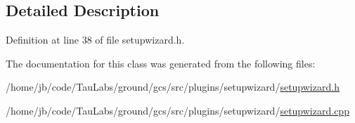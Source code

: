 \subsection{\-Detailed \-Description}


\-Definition at line 38 of file setupwizard.\-h.



\-The documentation for this class was generated from the following files\-:\begin{DoxyCompactItemize}
\item 
/home/jb/code/\-Tau\-Labs/ground/gcs/src/plugins/setupwizard/\hyperlink{setupwizard_8h}{setupwizard.\-h}\item 
/home/jb/code/\-Tau\-Labs/ground/gcs/src/plugins/setupwizard/\hyperlink{setupwizard_8cpp}{setupwizard.\-cpp}\end{DoxyCompactItemize}
